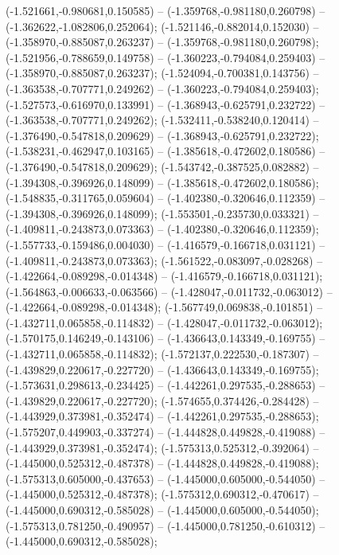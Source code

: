  (-1.521661,-0.980681,0.150585) -- (-1.359768,-0.981180,0.260798) -- (-1.362622,-1.082806,0.252064);
 (-1.521146,-0.882014,0.152030) -- (-1.358970,-0.885087,0.263237) -- (-1.359768,-0.981180,0.260798);
 (-1.521956,-0.788659,0.149758) -- (-1.360223,-0.794084,0.259403) -- (-1.358970,-0.885087,0.263237);
 (-1.524094,-0.700381,0.143756) -- (-1.363538,-0.707771,0.249262) -- (-1.360223,-0.794084,0.259403);
 (-1.527573,-0.616970,0.133991) -- (-1.368943,-0.625791,0.232722) -- (-1.363538,-0.707771,0.249262);
 (-1.532411,-0.538240,0.120414) -- (-1.376490,-0.547818,0.209629) -- (-1.368943,-0.625791,0.232722);
 (-1.538231,-0.462947,0.103165) -- (-1.385618,-0.472602,0.180586) -- (-1.376490,-0.547818,0.209629);
 (-1.543742,-0.387525,0.082882) -- (-1.394308,-0.396926,0.148099) -- (-1.385618,-0.472602,0.180586);
 (-1.548835,-0.311765,0.059604) -- (-1.402380,-0.320646,0.112359) -- (-1.394308,-0.396926,0.148099);
 (-1.553501,-0.235730,0.033321) -- (-1.409811,-0.243873,0.073363) -- (-1.402380,-0.320646,0.112359);
 (-1.557733,-0.159486,0.004030) -- (-1.416579,-0.166718,0.031121) -- (-1.409811,-0.243873,0.073363);
 (-1.561522,-0.083097,-0.028268) -- (-1.422664,-0.089298,-0.014348) -- (-1.416579,-0.166718,0.031121);
 (-1.564863,-0.006633,-0.063566) -- (-1.428047,-0.011732,-0.063012) -- (-1.422664,-0.089298,-0.014348);
 (-1.567749,0.069838,-0.101851) -- (-1.432711,0.065858,-0.114832) -- (-1.428047,-0.011732,-0.063012);
 (-1.570175,0.146249,-0.143106) -- (-1.436643,0.143349,-0.169755) -- (-1.432711,0.065858,-0.114832);
 (-1.572137,0.222530,-0.187307) -- (-1.439829,0.220617,-0.227720) -- (-1.436643,0.143349,-0.169755);
 (-1.573631,0.298613,-0.234425) -- (-1.442261,0.297535,-0.288653) -- (-1.439829,0.220617,-0.227720);
 (-1.574655,0.374426,-0.284428) -- (-1.443929,0.373981,-0.352474) -- (-1.442261,0.297535,-0.288653);
 (-1.575207,0.449903,-0.337274) -- (-1.444828,0.449828,-0.419088) -- (-1.443929,0.373981,-0.352474);
 (-1.575313,0.525312,-0.392064) -- (-1.445000,0.525312,-0.487378) -- (-1.444828,0.449828,-0.419088);
 (-1.575313,0.605000,-0.437653) -- (-1.445000,0.605000,-0.544050) -- (-1.445000,0.525312,-0.487378);
 (-1.575312,0.690312,-0.470617) -- (-1.445000,0.690312,-0.585028) -- (-1.445000,0.605000,-0.544050);
 (-1.575313,0.781250,-0.490957) -- (-1.445000,0.781250,-0.610312) -- (-1.445000,0.690312,-0.585028);
